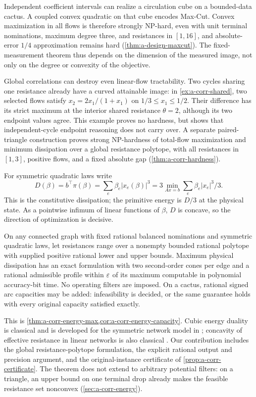 Independent coefficient intervals can realize a circulation cube on a
bounded-data cactus. A coupled convex quadratic on that cube encodes
Max-Cut. Convex maximization in all flows is therefore strongly
NP-hard, even with unit terminal nominations, maximum degree three, and
resistances in $[1,16]$, and absolute-error $1/4$ approximation remains
hard (\cref{thm:a-design-maxcut}). The fixed-measurement theorem thus
depends on the dimension of the measured image, not only on the degree
or convexity of the objective.

Global correlations can destroy even linear-flow tractability. Two
cycles sharing one resistance already have a curved attainable image:
in \cref{ex:a-corr-shared}, two selected flows satisfy
$x_2=2x_1/(1+x_1)$ on $1/3\le x_1\le1/2$.
Their difference has its strict maximum at the interior shared
resistance $\theta=2$, although its two endpoint values agree. This
example proves no hardness, but shows that independent-cycle endpoint
reasoning does not carry over. A separate paired-triangle construction
proves strong NP-hardness of total-flow maximization and minimum
dissipation over a global resistance polytope, with all resistances in
$[1,3]$, positive flows, and a fixed absolute gap
(\cref{thm:a-corr-hardness}).

For symmetric quadratic laws write
\[
 D(\beta)=b^\top\pi(\beta)=\sum_e\beta_e|x_e(\beta)|^3
          =3\min_{Ax=b}\sum_e\beta_e|x_e|^3/3.
\]
This is the constitutive dissipation; the primitive energy is $D/3$ at
the physical state. As a pointwise infimum of linear functions of
$\beta$, $D$ is concave, so the direction of optimization is decisive.

\begin{theorem}
\label{thm:main-energy}
On any connected graph with fixed rational balanced nominations and
symmetric quadratic laws, let resistances range over a nonempty bounded
rational polytope with supplied positive rational lower and upper bounds.
Maximum physical dissipation has an exact formulation with two
second-order cones per edge and a rational admissible profile within
$\varepsilon$ of its maximum computable in polynomial accuracy-bit time.
No operating filters are imposed. On a cactus, rational signed arc
capacities may be added: infeasibility is decided, or the same guarantee
holds with every original capacity satisfied exactly.
\end{theorem}

This is \cref{thm:a-corr-energy-max,cor:a-corr-energy-capacity}.
Cubic energy duality is classical and is developed for the symmetric
network model in \citet{gro2017-algorithmic-results-for-potential-based};
concavity of effective resistance in linear networks is also classical
\citep{shannon1956-concavity}. Our contribution includes the global
resistance-polytope formulation, the explicit rational output and
precision argument, and the original-instance certificate of
\cref{prop:a-corr-certificate}. The theorem does not extend to
arbitrary potential filters: on a triangle, an upper bound on one terminal drop already
makes the feasible resistance set nonconvex (\cref{sec:a-corr-energy}).

